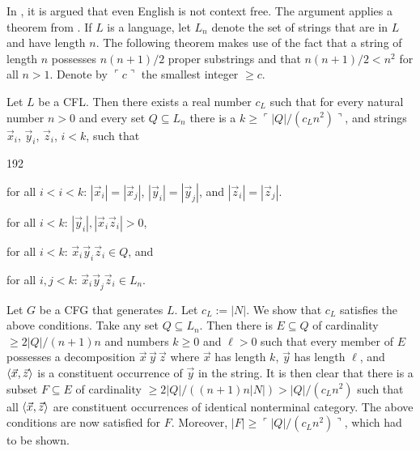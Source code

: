 In \cite{kacmanasterramerrounds:simultaneous}, it is argued that 
even English is not context free. The argument applies a theorem 
from \cite{ogdenrosswinkelmann:interchange}. If $L$ is a 
language, let $L_n$ denote the set of strings that are in $L$ and 
have length $n$. The following theorem makes use of the fact that 
a string of length $n$ possesses $n(n+1)/2$ proper substrings and 
that $n(n+1)/2 < n^2$ for all $n > 1$. Denote by $\ulcorner c \urcorner$ 
the smallest integer $\geq c$.  
\begin{thm}
\label{thm:interchange}
Let $L$ be a CFL. Then there exists a real number 
$c_L$ such that for every natural number $n > 0$ and every set 
$Q \subseteq L_n$ there is a $k \geq \ulcorner |Q|/(c_L n^2)\urcorner$, 
and strings $\vec{x}_i$, $\vec{y}_i$, $\vec{z}_i$, $i < k$, such that 
\begin{dingautolist}{192}
\item for all $i < i < k$: $|\vec{x}_i| = |\vec{x}_j|$, 
$|\vec{y}_i| = |\vec{y}_j|$, 
and $|\vec{z}_i| = |\vec{z}_j|$.
\item for all $i < k$: $|\vec{y}_i|, |\vec{x}_i\vec{z}_i| > 0$, 
\item for all $i < k$: $\vec{x}_i\vec{y}_i\vec{z}_i \in Q$, and 
\item for all $i, j < k$: $\vec{x}_i\vec{y}_j\vec{z}_i \in L_n$.
\end{dingautolist}
\end{thm}
\proofbeg
Let $G$ be a CFG that generates $L$. Let $c_L := |N|$. We show 
that $c_L$ satisfies the above conditions. Take any set $Q \subseteq 
L_n$. Then there is $E \subseteq Q$ of cardinality $\geq 2 |Q|/(n+1)n$ 
and numbers $k \geq 0$ and $\ell > 0$ such that every member of $E$ 
possesses a decomposition $\vec{x}\,\vec{y}\,\vec{z}$ where $\vec{x}$ has 
length $k$, $\vec{y}$ has length $\ell$, and $\langle \vec{x}, \vec{z}\rangle$ 
is a constituent occurrence of $\vec{y}$ in the string. It is 
then clear that there is a subset $F \subseteq E$ of cardinality 
$\geq 2 |Q|/((n+1)n |N|) > |Q|/(c_L n^2)$ such that 
all $\langle \vec{x}, \vec{z}\rangle$ are constituent occurrences of 
identical nonterminal category. The above conditions are now 
satisfied for $F$. Moreover, 
$|F| \geq \ulcorner |Q|/(c_L n^2)\urcorner$, which had to be shown.   
\proofend


